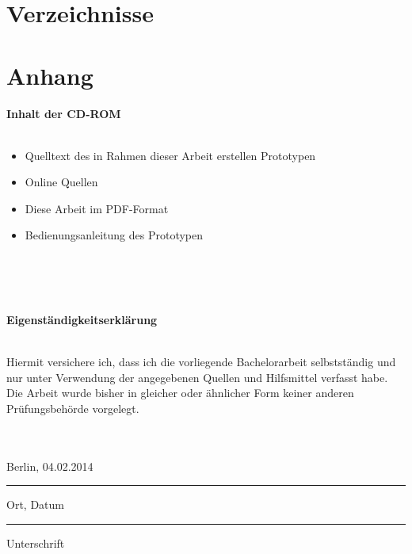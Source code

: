 \documentclass[a4paper,11pt,oneside,%
headsepline,												%
footsepline,												%
bibtotocnumbered									%
]{scrreprt}
\begin{document}
\newpage
\begingroup
   \setlength{}
   \printbibheading
\printbibliography[type=book,heading=subbibliography,title={Buch Quellen}]
\printbibliography[nottype=book,heading=subbibliography,title={Online Quellen}]
\endgroup



\chapter{Verzeichnisse}
\begingroup
\let\clearpage\relax
\listoffigures
\endgroup

\begingroup
\let\clearpage\relax
\listoftables
\endgroup

\begingroup
\renewcommand\listoflistingscaption{Verzeichnis aller Codebeispiele}
\let\clearpage\relax
\listoflistings
\endgroup

\chapter{Anhang}

\begin{LARGE}
\textbf{Inhalt der CD-ROM}\\\\
\end{LARGE} 
\begin{itemize}
	\item Quelltext des in Rahmen dieser Arbeit erstellen Prototypen
	\item Online Quellen
	\item Diese Arbeit im PDF-Format
	\item Bedienungsanleitung des Prototypen
\end{itemize}
\newpage

\hfil\\\\\\

\begin{LARGE}
\textbf{Eigenständigkeitserklärung}\\\\
\end{LARGE} 
Hiermit versichere ich, dass ich die vorliegende Bachelorarbeit selbstständig und nur
unter Verwendung der angegebenen Quellen und Hilfsmittel verfasst habe. Die Arbeit
wurde bisher in gleicher oder ähnlicher Form keiner anderen Prüfungsbehörde vorgelegt.\\\\\\

\parbox{4cm}{\centering Berlin, 04.02.2014\hrule
\strut \centering\footnotesize Ort, Datum} \hfill\parbox{4cm}{\hrule
\strut \centering\footnotesize Unterschrift}
\end{document}
